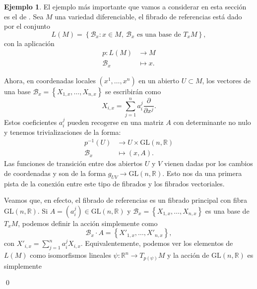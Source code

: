 \documentclass[12pt,a4paper]{article}
\theoremstyle{definition} \newtheorem{defn}[thm]{Definición}
\theoremstyle{definition} \newtheorem{ejemplo}[thm]{Ejemplo}
\theoremstyle{definition} \newtheorem{ejercicio}[thm]{Ejercicio}
\theoremstyle{remark} \newtheorem*{obs}{Observación}
\def\RR{\mathbb{R}}
\let\emph\relax
\begin{document}
		  \begin{ejemplo}
		    El ejemplo más importante que vamos a considerar en esta sección es el de \emph{fibrado de referencias}. Sea $M$ una variedad diferenciable, el fibrado de referencias está dado por el conjunto
		    \begin{equation*}
		      L(M)=\left\{ \mathcal{B}_x: x\in M,\  \mathcal{B}_x \text{ es una base de } T_xM \right\},
		    \end{equation*}
		     con la aplicación
		     \begin{align*}
		       p :L(M)&\longrightarrow M\\ 
		       \mathcal{B}_x &\longmapsto x. 
		       \end{align*}

		       Ahora, en coordenadas locales $(x^1,\dots,x^n)$ en un abierto $U\subset M$, los vectores de una base $\mathcal{B}_x=\left\{ X_{1,x},\dots,X_{n,x} \right\}$ se escribirán como
		       \begin{equation*}
			 X_{i,x}=\sum_{j=1}^n a_i^j \frac{\partial}{\partial x^j}.
		       \end{equation*}
		       Estos coeficientes $a_i^j$ pueden recogerse en una matriz $A$ con determinante no nulo y tenemos trivializaciones de la forma:
		       \begin{align*}
			 p^{-1}(U)&\longrightarrow U\times \mathrm{GL}(n,\RR)\\ 
			 \mathcal{B}_x &\longmapsto (x,A). 
			 \end{align*}
			 Las funciones de transición entre dos abiertos $U$ y $V$ vienen dadas por los cambios de coordenadas y son de la forma $g_{UV} \rightarrow \mathrm{GL}(n,\RR)$. Esto nos da una primera pista de la conexión entre este tipo de fibrados y los fibrados vectoriales.

			 Veamos que, en efecto, el fibrado de referencias es un fibrado principal con fibra $\mathrm{GL}(n,\RR)$. Si $A=(a^j_i)\in \mathrm{GL}(n,\RR)$ y $\mathcal{B}_x=\left\{ X_{1,x},\dots,X_{n,x} \right\}$ es una base de $T_xM$, podemos definir la acción simplemente como
			 \begin{equation*}
			   \mathcal{B}_x\cdot A =\left\{ X'_{1,x},\dots,X'_{n,x} \right\},
			 \end{equation*}
			 con $X'_{i,x}=\sum_{j=1}^n a^j_i X_{i,x}$. Equivalentemente, podemos ver los elementos de $L(M)$ como isomorfismos lineales $\psi:\RR^n \rightarrow T_{p(\psi)} M$ y la acción de $\mathrm{GL}(n,\RR)$ es simplemente
			 \begin{center}
			 \end{center}
			\qed   
		  \end{ejemplo}
\end{document}
